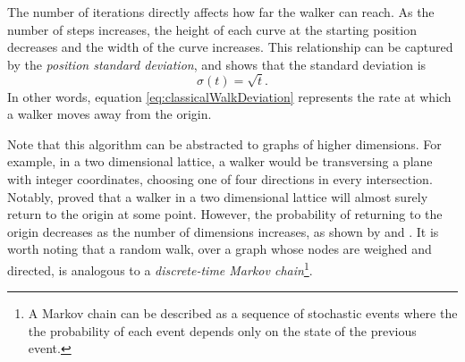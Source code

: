 \documentclass[../../dissertation.tex]{subfiles}
\begin{document}
The number of iterations directly affects how far the walker can reach. As the number of
steps increases, the height of each curve at the starting position decreases
and the width of the curve increases. This relationship can be captured by the
\textit{position standard deviation}, and \cite{REN1} shows that the standard
deviation is
\begin{equation}
	\sigma(t) = \sqrt{t}.
	\label{eq:classicalWalkDeviation}
\end{equation}
In other words, equation \eqref{eq:classicalWalkDeviation} represents the rate at
which a walker moves away from the origin.\par
Note that this algorithm can be abstracted to graphs of higher dimensions. For
example, in a two dimensional lattice, a walker would be transversing a plane
with integer coordinates, choosing one of four directions in every
intersection. Notably, \cite{polya1921} proved that a walker in a two
dimensional lattice will almost surely return to the origin at some point.
However, the probability of returning to the origin decreases as the number of
dimensions increases, as shown by \cite{montrol1956} and \cite{finch2003}.
It is worth noting that a random walk, over a graph whose nodes are weighed and
directed, is analogous to a \textit{discrete-time Markov chain}\footnote{A
Markov chain can be described as a sequence of stochastic events where the the
probability of each event depends only on the state of the previous
event.}.
\end{document}

